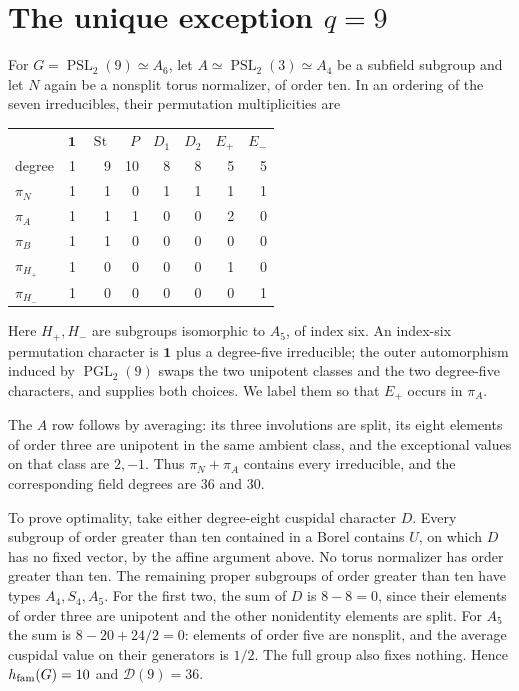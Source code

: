 \documentclass[11pt]{article}
\theoremstyle{remark}\newtheorem{remark}[theorem]{Remark}
\newcommand{\St}{\operatorname{St}}
\newcommand{\PSL}{\operatorname{PSL}}
\newcommand{\PGL}{\operatorname{PGL}}
\newcommand{\one}{\mathbf 1}
\begin{document}
\section{The unique exception \texorpdfstring{$q=9$}{q = 9}}\label{sec:q9}
For $G=\PSL_2(9)\simeq A_6$, let $A\simeq\PSL_2(3)\simeq A_4$ be a
subfield subgroup and let $N$ again be a nonsplit torus normalizer, of
order ten. In an ordering of the seven irreducibles, their permutation
multiplicities are
\begin{center}
\begin{tabular}{@{}lrrrrrrr@{}}\toprule
 & $\one$&$\St$&$P$&$D_1$&$D_2$&$E_+$&$E_-$\\
degree&1&9&10&8&8&5&5\\\midrule
$\pi_N$&1&1&0&1&1&1&1\\
$\pi_A$&1&1&1&0&0&2&0\\
$\pi_B$&1&1&0&0&0&0&0\\
$\pi_{H_+}$&1&0&0&0&0&1&0\\
$\pi_{H_-}$&1&0&0&0&0&0&1\\\bottomrule
\end{tabular}
\end{center}
Here $H_+,H_-$ are subgroups isomorphic to $A_5$, of index six.
An index-six permutation character is $\one$ plus a degree-five
irreducible; the outer automorphism induced by $\PGL_2(9)$ swaps the
two unipotent classes and the two degree-five characters, and supplies
both choices. We label them so that $E_+$ occurs in $\pi_A$.

The $A$ row follows by averaging: its three involutions are split, its
eight elements of order three are unipotent in the same ambient class,
and the exceptional values on that class are $2,-1$.
Thus $\pi_N+\pi_A$ contains every irreducible, and the corresponding
field degrees are $36$ and $30$.

To prove optimality, take either degree-eight cuspidal character $D$.
Every subgroup of order greater than ten contained in a Borel contains
$U$, on which $D$ has no fixed vector, by the affine argument above.
No torus normalizer has order greater than ten. The remaining proper
subgroups of order greater than ten have types $A_4,S_4,A_5$.
For the first two, the sum of $D$ is $8-8=0$, since their elements of
order three are unipotent and the other nonidentity elements are split.
For $A_5$ the sum is $8-20+24/2=0$: elements of order five are nonsplit,
and the average cuspidal value on their generators is $1/2$.
The full group also fixes nothing. Hence $h_{\rm fam}(G)=10$ and
$\mathcal D(9)=36$.
\end{document}
